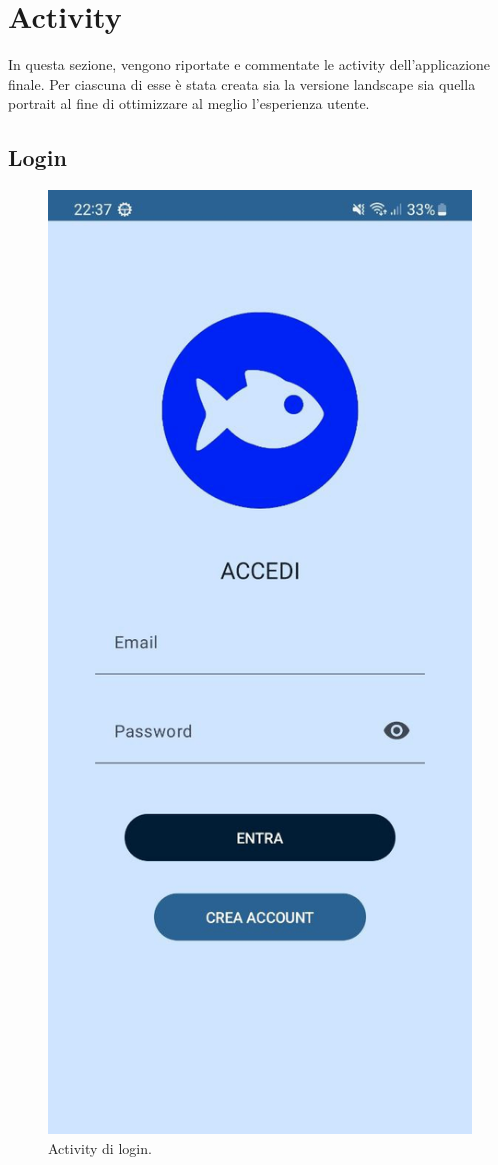 \documentclass[a4paper,final,12pt]{report}
\begin{document}
\newpage

\section{Activity}
In questa sezione, vengono riportate e commentate le activity dell'applicazione finale. Per ciascuna di esse è stata creata sia la versione landscape sia quella portrait al fine di ottimizzare al meglio l'esperienza utente. 

\subsection{Login}
\begin{figure}[hbtp]
\centering
\includegraphics[scale=0.20]{img_concettuale/accmob.jpg}
\caption{Activity di login.}
\label{figura:actlogin}
\end{figure}
\end{document}
